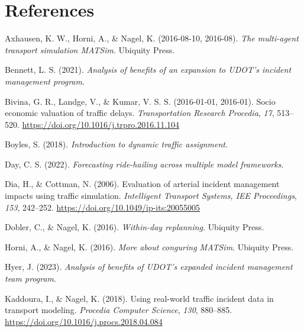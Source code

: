 \documentclass[fancy, oneside, mastersfancy, ms]{byuthesis}
\newlength{\cslhangindent}
\newlength{\cslentryspacingunit} %
\newenvironment{CSLReferences}[2] %
 {%
  \setlength{\parindent}{0pt}
  \ifodd #1
  \let\oldpar\par
  \def\par{\hangindent=\cslhangindent\oldpar}
  \fi
  \setlength{\parskip}{#2\cslentryspacingunit}
 }%
 {}
\begin{document}

\hypertarget{references}{%
\chapter*{References}\label{references}}


\hypertarget{refs}{}
\begin{CSLReferences}{1}{0}
\leavevmode{}%
Axhausen, K. W., Horni, A., \& Nagel, K. (2016-08-10, 2016-08).
\emph{The multi-agent transport simulation {MATSim}}. {Ubiquity Press}.

\leavevmode{}%
Bennett, L. S. (2021). \emph{Analysis of benefits of an expansion to
UDOT's incident management program}.

\leavevmode{}%
Bivina, G. R., Landge, V., \& Kumar, V. S. S. (2016-01-01, 2016-01).
Socio economic valuation of traffic delays. \emph{Transportation
Research Procedia}, \emph{17}, 513--520.
\url{https://doi.org/10.1016/j.trpro.2016.11.104}

\leavevmode{}%
Boyles, S. (2018). \emph{Introduction to dynamic traffic assignment}.

\leavevmode{}%
Day, C. S. (2022). \emph{Forecasting ride-hailing across multiple model
frameworks}.

\leavevmode{}%
Dia, H., \& Cottman, N. (2006). Evaluation of arterial incident
management impacts using traffic simulation. \emph{Intelligent Transport
Systems, IEE Proceedings}, \emph{153}, 242--252.
\url{https://doi.org/10.1049/ip-its:20055005}

\leavevmode{}%
Dobler, C., \& Nagel, K. (2016). \emph{Within-day replanning}. {Ubiquity
Press}.

\leavevmode{}%
Horni, A., \& Nagel, K. (2016). \emph{More about conguring MATSim}.
{Ubiquity Press}.

\leavevmode{}%
Hyer, J. (2023). \emph{Analysis of benefits of UDOT's expanded incident
management team program}.

\leavevmode{}%
Kaddoura, I., \& Nagel, K. (2018). Using real-world traffic incident
data in transport modeling. \emph{Procedia Computer Science},
\emph{130}, 880--885. \url{https://doi.org/10.1016/j.procs.2018.04.084}


\end{CSLReferences}
\end{document}
